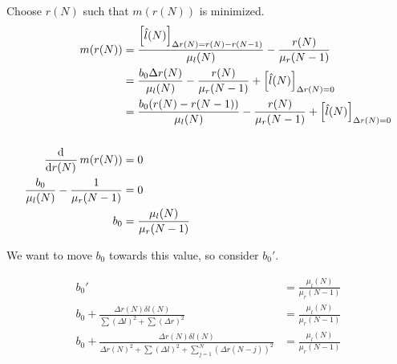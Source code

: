 \documentclass[12pt]{article}
\begin{document}
Choose $r(N)$ such that $m(r(N))$ is minimized.
\begin{align*}
    m(r(N)) &=\frac{\sbr{\hat{l}(N)}_{\Delta r(N) = r(N) - r(N - 1)}}{\mu_l(N)} - \frac{r(N)}{\mu_r(N - 1)}\\
    &= \frac{b_0 \Delta r(N)}{\mu_l(N)} - \frac{r(N)}{\mu_r(N - 1)}
    + \sbr{\hat{l}(N)}_{\Delta r(N) = 0}\\
    &= \frac{b_0 (r(N) - r(N - 1))}{\mu_l(N)} - \frac{r(N)}{\mu_r(N - 1)}
    + \sbr{\hat{l}(N)}_{\Delta r(N) = 0}\\
    \\
    \dod{}{r(N)} m(r(N)) &= 0\\
    \frac{b_0}{\mu_l(N)} - \frac{1}{\mu_r(N - 1)} &= 0\\
    b_0 &= \frac{\mu_l(N)}{\mu_r(N - 1)}\\
\end{align*}

We want to move $b_0$ towards this value, so consider $b_0'$.

\begin{align*}
    b_0' &= \frac{\mu_l(N)}{\mu_r(N - 1)}\\
    b_0 + \frac{\Delta r(N) \delta l(N)}{\sum (\Delta l)^2 + \sum (\Delta r)^2} &= \frac{\mu_l(N)}{\mu_r(N - 1)}\\
    b_0 + \frac{\Delta r(N) \delta l(N)}{\Delta r(N)^2 + \sum (\Delta l)^2
    + \sum _{j = 1}^N (\Delta r(N - j))^2} &= \frac{\mu_l(N)}{\mu_r(N - 1)}\\
\end{align*}
\end{document}

